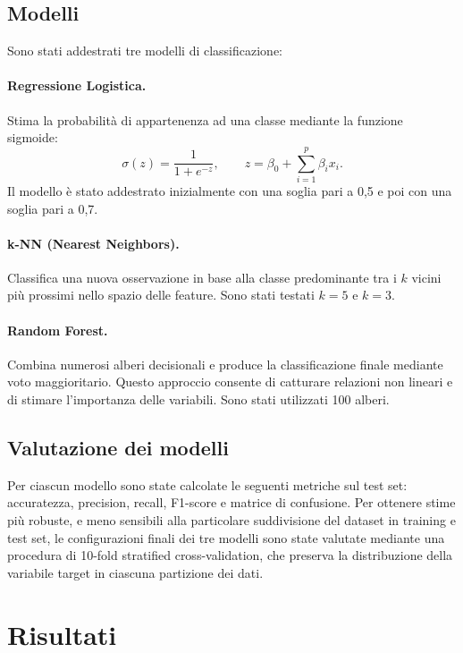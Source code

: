 \documentclass[11pt,a4paper]{article}
\begin{document}
\subsection{Modelli}

Sono stati addestrati tre modelli di classificazione:

\paragraph{Regressione Logistica.} Stima la probabilit\`{a} di appartenenza ad una classe mediante la funzione sigmoide:
\begin{equation}
    \sigma(z) = \frac{1}{1 + e^{-z}}, \qquad z = \beta_0 + \sum_{i=1}^{p} \beta_i x_i .
\end{equation}
Il modello \`{e} stato addestrato inizialmente con una soglia pari a 0,5 e poi con una soglia pari a 0,7.

\paragraph{k-NN (Nearest Neighbors).} Classifica una nuova osservazione in base alla classe predominante tra i $k$ vicini pi\`{u} prossimi nello spazio delle feature. Sono stati testati $k = 5$ e $k = 3$.

\paragraph{Random Forest.} Combina numerosi alberi decisionali e produce la classificazione finale mediante voto maggioritario. Questo approccio consente di catturare relazioni non lineari e di stimare l'importanza delle variabili. Sono stati utilizzati 100 alberi.

\subsection{Valutazione dei modelli}

Per ciascun modello sono state calcolate le seguenti metriche sul test set: accuratezza, precision, recall, F1-score e matrice di confusione. Per ottenere stime pi\`{u} robuste, e meno sensibili alla particolare suddivisione del dataset in training e test set, le configurazioni finali dei tre modelli sono state valutate mediante una procedura di 10-fold stratified cross-validation, che preserva la distribuzione della variabile target in ciascuna partizione dei dati.


\section{Risultati}
\label{sec:risultati}
\end{document}
